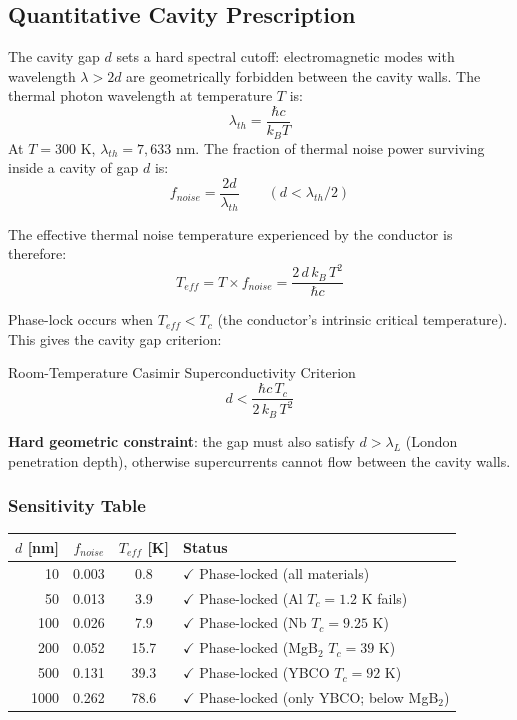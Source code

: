 \subsection{Quantitative Cavity Prescription}
\label{sec:casimir_prescription}

The cavity gap $d$ sets a hard spectral cutoff: electromagnetic modes with wavelength $\lambda > 2d$ are geometrically forbidden between the cavity walls. The thermal photon wavelength at temperature $T$ is:
\begin{equation}
    \lambda_{th} = \frac{\hbar c}{k_B T}
\end{equation}
At $T = 300$ K, $\lambda_{th} = 7{,}633$ nm. The fraction of thermal noise power surviving inside a cavity of gap $d$ is:
\begin{equation}
    f_{noise} = \frac{2d}{\lambda_{th}} \qquad (d < \lambda_{th}/2)
\end{equation}

The effective thermal noise temperature experienced by the conductor is therefore:
\begin{equation}
    T_{eff} = T \times f_{noise} = \frac{2\,d\,k_B\,T^2}{\hbar c}
\end{equation}

Phase-lock occurs when $T_{eff} < T_c$ (the conductor's intrinsic critical temperature). This gives the cavity gap criterion:
\begin{resultbox}{Room-Temperature Casimir Superconductivity Criterion}
\begin{equation}
    \boxed{d < \frac{\hbar c \, T_c}{2\,k_B\,T^2}}
\end{equation}
\end{resultbox}

\noindent\textbf{Hard geometric constraint}: the gap must also satisfy $d > \lambda_L$ (London penetration depth), otherwise supercurrents cannot flow between the cavity walls.

\subsubsection{Sensitivity Table}

\begin{center}
\renewcommand{\arraystretch}{1.3}
\begin{tabular}{r c c l}
\toprule
$d$ [nm] & $f_{noise}$ & $T_{eff}$ [K] & Status \\
\midrule
10  & 0.003 & 0.8  & $\checkmark$ Phase-locked (all materials) \\
50  & 0.013 & 3.9  & $\checkmark$ Phase-locked (Al $T_c = 1.2$ K fails) \\
100 & 0.026 & 7.9  & $\checkmark$ Phase-locked (Nb $T_c = 9.25$ K) \\
200 & 0.052 & 15.7 & $\checkmark$ Phase-locked (MgB$_2$ $T_c = 39$ K) \\
500 & 0.131 & 39.3 & $\checkmark$ Phase-locked (YBCO $T_c = 92$ K) \\
1000 & 0.262 & 78.6 & $\checkmark$ Phase-locked (only YBCO; below MgB$_2$) \\
\bottomrule
\end{tabular}
\end{center}

